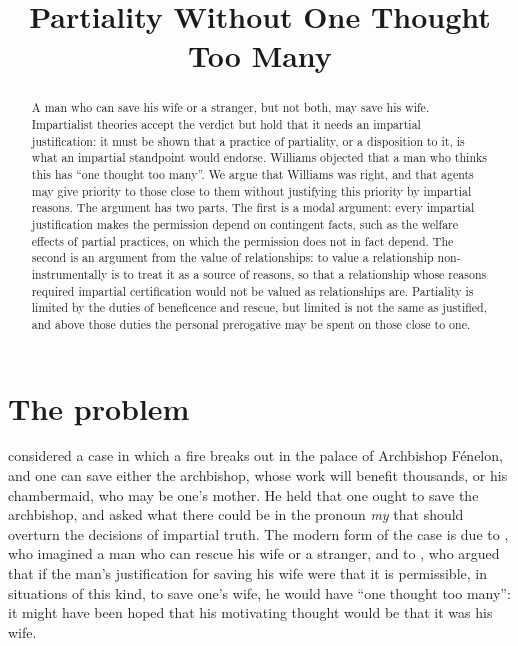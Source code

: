 \documentclass{situationist-preprint}
\title{Partiality Without One Thought Too Many}
\begin{document}
\maketitle

\begin{abstract}
A man who can save his wife or a stranger, but not both, may save his wife. Impartialist theories accept the verdict but hold that it needs an impartial justification: it must be shown that a practice of partiality, or a disposition to it, is what an impartial standpoint would endorse. Williams objected that a man who thinks this has \enquote{one thought too many}. We argue that Williams was right, and that agents may give priority to those close to them without justifying this priority by impartial reasons. The argument has two parts. The first is a modal argument: every impartial justification makes the permission depend on contingent facts, such as the welfare effects of partial practices, on which the permission does not in fact depend. The second is an argument from the value of relationships: to value a relationship non-instrumentally is to treat it as a source of reasons, so that a relationship whose reasons required impartial certification would not be valued as relationships are. Partiality is limited by the duties of beneficence and rescue, but limited is not the same as justified, and above those duties the personal prerogative may be spent on those close to one.
\end{abstract}

\section{The problem}

\citet{Godwin1793} considered a case in which a fire breaks out in the palace of Archbishop F\'enelon, and one can save either the archbishop, whose work will benefit thousands, or his chambermaid, who may be one's mother. He held that one ought to save the archbishop, and asked what there could be in the pronoun \emph{my} that should overturn the decisions of impartial truth. The modern form of the case is due to \citet{Fried1970}, who imagined a man who can rescue his wife or a stranger, and to \citet{Williams1981}, who argued that if the man's justification for saving his wife were that it is permissible, in situations of this kind, to save one's wife, he would have \enquote{one thought too many}: it might have been hoped that his motivating thought would be that it was his wife.
\end{document}
